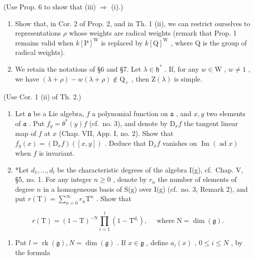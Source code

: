(Use Prop. 6 to show that (iii) \(\Longrightarrow\) (i).)

\begin{enumerate}
\def\labelenumi{\arabic{enumi})}
\setcounter{enumi}{3}
\item
  Show that, in Cor. 2 of Prop. 2, and in Th. 1 (ii), we can restrict ourselves to representations \(\rho\) whose weights are radical weights (remark that Prop. 1 remains valid when \(k[\mathrm{P}]^{\mathrm{W}}\) is replaced by \(k[\mathrm{Q}]^{\mathrm{W}}\) , where \(\mathrm{Q}\) is the group of radical weights).
\item
  We retain the notations of §6 and §7. Let \(\lambda \in \mathfrak{h}^*\) . If, for any \(w \in \mathrm{W}\) , \(w \neq 1\) , we have \((\lambda + \rho) - w(\lambda + \rho) \notin \mathrm{Q}_+\) , then \(\mathrm{Z}(\lambda)\) is simple.
\end{enumerate}

(Use Cor. 1 (ii) of Th. 2.)

\begin{enumerate}
\def\labelenumi{\arabic{enumi})}
\setcounter{enumi}{5}
\item
  Let \(\mathfrak{a}\) be a Lie algebra, \(f\) a polynomial function on \(\mathfrak{a}\) , and \(x, y\) two elements of \(\mathfrak{a}\) . Put \(f_y = \theta^*(y)f\) (cf.~no. 3), and denote by \(\mathrm{D}_x f\) the tangent linear map of \(f\) at \(x\) (Chap. VII, App. I, no. 2). Show that \(f_y(x) = (\mathrm{D}_xf)([x,y])\) . Deduce that \(\mathrm{D}_xf\) vanishes on \(\operatorname{Im}(\operatorname{ad}x)\) when \(f\) is invariant.
\item
  *Let \(d_1, \ldots, d_l\) be the characteristic degrees of the algebra I(g), cf.~Chap. V, §5, no. 1. For any integer \(n \geq 0\) , denote by \(r_n\) the number of elements of degree \(n\) in a homogeneous basis of S(g) over I(g) (cf.~no. 3, Remark 2), and put \(r(\mathrm{T}) = \sum_{n=0}^{\infty} r_n \mathrm{T}^n\) . Show that
\end{enumerate}

\[
r (\mathrm{T}) = (1 - \mathrm{T}) ^ {- \mathrm{N}} \prod_ {i = 1} ^ {l} (1 - \mathrm{T} ^ {d _ {i}}), \quad \text { where } \mathrm{N} = \dim (\mathfrak {g}).
\]

\begin{enumerate}
\def\labelenumi{\arabic{enumi})}
\setcounter{enumi}{7}
\tightlist
\item
  Put \(l = \operatorname{rk}(\mathfrak{g}), N = \dim(\mathfrak{g})\) . If \(x \in \mathfrak{g}\) , define \(a_i(x)\) , \(0 \leq i \leq N\) , by the formula
\end{enumerate}

